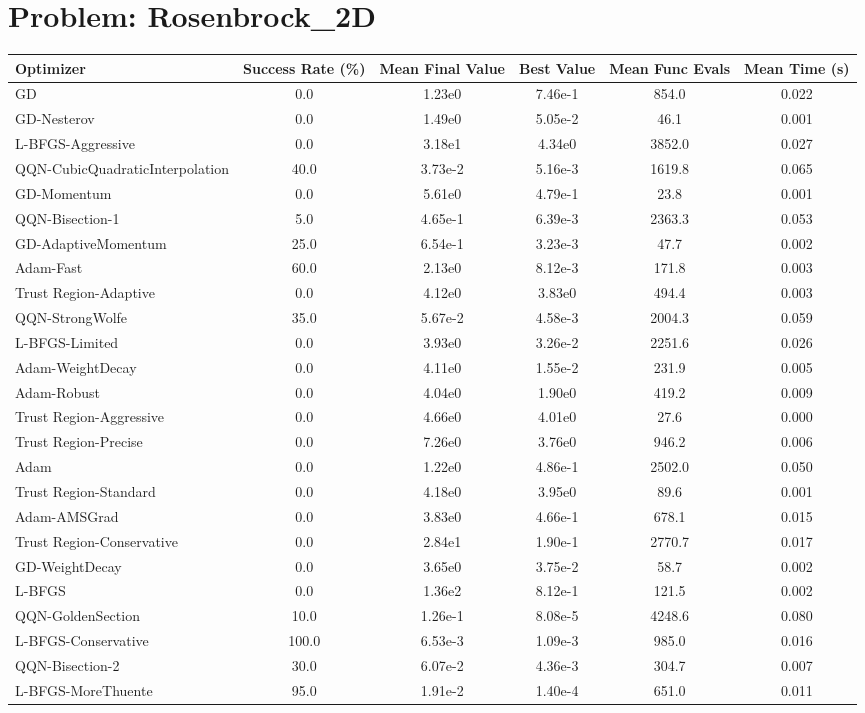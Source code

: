 \documentclass{article}
\begin{document}
\section{Problem: Rosenbrock\_2D}
\begin{longtable}{p{3cm}*{5}{c}}
\toprule
\textbf{Optimizer} & \textbf{Success Rate (\%)} & \textbf{Mean Final Value} & \textbf{Best Value} & \textbf{Mean Func Evals} & \textbf{Mean Time (s)} \\
\midrule
GD & 0.0 & 1.23e0 & 7.46e-1 & 854.0 & 0.022 \\
GD-Nesterov & 0.0 & 1.49e0 & 5.05e-2 & 46.1 & 0.001 \\
L-BFGS-Aggressive & 0.0 & 3.18e1 & 4.34e0 & 3852.0 & 0.027 \\
QQN-CubicQuadraticInterpolation & 40.0 & 3.73e-2 & 5.16e-3 & 1619.8 & 0.065 \\
GD-Momentum & 0.0 & 5.61e0 & 4.79e-1 & 23.8 & 0.001 \\
QQN-Bisection-1 & 5.0 & 4.65e-1 & 6.39e-3 & 2363.3 & 0.053 \\
GD-AdaptiveMomentum & 25.0 & 6.54e-1 & 3.23e-3 & 47.7 & 0.002 \\
Adam-Fast & 60.0 & 2.13e0 & 8.12e-3 & 171.8 & 0.003 \\
Trust Region-Adaptive & 0.0 & 4.12e0 & 3.83e0 & 494.4 & 0.003 \\
QQN-StrongWolfe & 35.0 & 5.67e-2 & 4.58e-3 & 2004.3 & 0.059 \\
L-BFGS-Limited & 0.0 & 3.93e0 & 3.26e-2 & 2251.6 & 0.026 \\
Adam-WeightDecay & 0.0 & 4.11e0 & 1.55e-2 & 231.9 & 0.005 \\
Adam-Robust & 0.0 & 4.04e0 & 1.90e0 & 419.2 & 0.009 \\
Trust Region-Aggressive & 0.0 & 4.66e0 & 4.01e0 & 27.6 & 0.000 \\
Trust Region-Precise & 0.0 & 7.26e0 & 3.76e0 & 946.2 & 0.006 \\
Adam & 0.0 & 1.22e0 & 4.86e-1 & 2502.0 & 0.050 \\
Trust Region-Standard & 0.0 & 4.18e0 & 3.95e0 & 89.6 & 0.001 \\
Adam-AMSGrad & 0.0 & 3.83e0 & 4.66e-1 & 678.1 & 0.015 \\
Trust Region-Conservative & 0.0 & 2.84e1 & 1.90e-1 & 2770.7 & 0.017 \\
GD-WeightDecay & 0.0 & 3.65e0 & 3.75e-2 & 58.7 & 0.002 \\
L-BFGS & 0.0 & 1.36e2 & 8.12e-1 & 121.5 & 0.002 \\
QQN-GoldenSection & 10.0 & 1.26e-1 & 8.08e-5 & 4248.6 & 0.080 \\
L-BFGS-Conservative & 100.0 & 6.53e-3 & 1.09e-3 & 985.0 & 0.016 \\
QQN-Bisection-2 & 30.0 & 6.07e-2 & 4.36e-3 & 304.7 & 0.007 \\
L-BFGS-MoreThuente & 95.0 & 1.91e-2 & 1.40e-4 & 651.0 & 0.011 \\
\bottomrule
\end{longtable}
\end{document}
